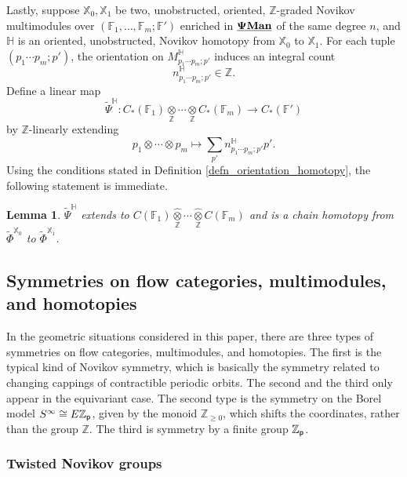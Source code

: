 \documentclass[reqno, 10pt]{amsart}
\numberwithin{equation}{section}
\numberwithin{equation}{section}
\newtheorem{lemma}[thm]{Lemma}
\theoremstyle{definition}
\theoremstyle{remark}
\newcommand{\beqn}{\begin{equation*}}
\newcommand{\eeqn}{\end{equation*}}
\newcommand{\mb}{\mathbb}
\newcommand{\zp}{{{\mb Z}_{\sf p}}}
\newcommand{\pman}{\uds{{\bf \Psi}{\bf Man}}}
\newcommand{\uds}[1]{\underline{\smash{#1}}}
\begin{document}
Lastly, suppose ${\mb X}_0, {\mb X}_1$ be two, unobstructed, oriented, ${\mb Z}$-graded Novikov multimodules over $({\mb F}_1, \ldots, {\mb F}_m; {\mb F}')$ enriched in $\pman$ of the same degree $n$, and ${\mb H}$ is an oriented, unobstructed, Novikov homotopy from ${\mb X}_0$ to ${\mb X}_1$. For each tuple $(p_1 \cdots p_m; p')$, the orientation on $M_{p_1 \cdots p_m;p'}^{\mb H}$ induces an integral count
\beqn
n_{p_1 \cdots p_m; p'}^{\mb H}\in {\mb Z}.
\eeqn
Define a linear map 
\beqn
\tilde \Psi^{\mb H}: C_*({\mb F}_1) \underset{{\mb Z}}{\otimes} \cdots \underset{{\mb Z}}{\otimes} C_*({\mb F}_m) \to C_*({\mb F}')
\eeqn
by ${\mb Z}$-linearly extending 
\beqn
p_1\otimes \cdots \otimes p_m \mapsto \sum_{p'} n_{p_1 \cdots p_m; p'}^{\mb H} p'.
\eeqn
Using the conditions stated in Definition \ref{defn_orientation_homotopy}, the following statement is immediate.

\begin{lemma}\label{lemma:homotopy}
$\tilde \Psi^{\mb H}$ extends to $C ({\mb F}_1) \widehat{\underset{{\mb Z}}{\otimes}} \cdots \widehat {\underset{{\mb Z}}{\otimes}} C({\mb F}_m)$ and is a chain homotopy from $\tilde \Phi^{{\mb X}_0}$ to $\tilde \Phi^{{\mb X}_1}$. 
\end{lemma}



\subsection{Symmetries on flow categories, multimodules, and homotopies}\label{subsection_Novikov_symmetry}

In the geometric situations considered in this paper, there are three types of symmetries on flow categories, multimodules, and homotopies. The first is the typical kind of Novikov symmetry, which is basically the symmetry related to changing cappings of contractible periodic orbits. The second and the third only appear in the equivariant case. The second type is the symmetry on the Borel model $S^\infty \cong E\zp$, given by the monoid ${\mb Z}_{\geq 0}$, which shifts the coordinates, rather than the group ${\mb Z}$. The third is symmetry by a finite group $\zp$. 


\subsubsection{Twisted Novikov groups}
\end{document}
